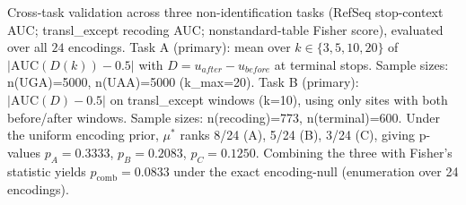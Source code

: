 Cross-task validation across three non-identification tasks (RefSeq stop-context AUC; transl\_except recoding AUC; nonstandard-table Fisher score), evaluated over all $24$ encodings. Task A (primary): mean over $k\in\{3, 5, 10, 20\}$ of $|\mathrm{AUC}(D(k))-0.5|$ with $D=u_{after}-u_{before}$ at terminal stops. Sample sizes: n(UGA)=5000, n(UAA)=5000 (k\_max=20). Task B (primary): $|\mathrm{AUC}(D)-0.5|$ on transl\_except windows (k=10), using only sites with both before/after windows. Sample sizes: n(recoding)=773, n(terminal)=600. Under the uniform encoding prior, $\mu^\ast$ ranks 8/24 (A), 5/24 (B), 3/24 (C), giving p-values $p_A=0.3333$, $p_B=0.2083$, $p_C=0.1250$. Combining the three with Fisher's statistic yields $p_\mathrm{comb}=0.0833$ under the exact encoding-null (enumeration over 24 encodings).
